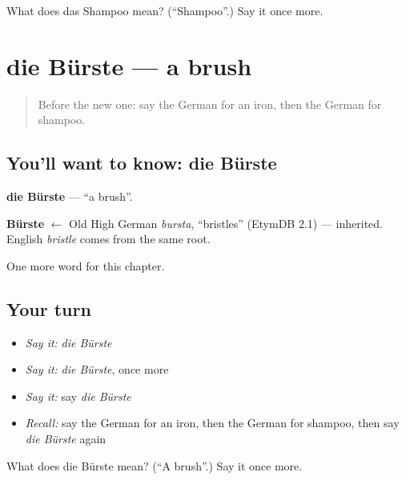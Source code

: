 \begin{tcolorbox}[breakable,colback=teal!4,colframe=teal!35!black,title={Before you move on}]
What does das Shampoo mean? (\textquotedblleft{}Shampoo\textquotedblright{}.) Say it once more.
\end{tcolorbox}
\section[die Bürste]{die Bürste — a brush}

\label{lesson:GE-C202-buerste}



\begin{quote}
Before the new one: say the German for an iron, then the German for shampoo.
\end{quote}

\subsection*{You'll want to know: die Bürste}
\textbf{die Bürste} — \textquotedblleft{}a brush\textquotedblright{}.

\begin{cousinweb}
\textbf{Bürste} $\leftarrow$ Old High German \emph{bursta}, \textquotedblleft{}bristles\textquotedblright{} (EtymDB 2.1) — inherited. English \emph{bristle} comes from the same root.
\end{cousinweb}

\begin{grammarlens}[title={What you've built}]
One more word for this chapter.
\end{grammarlens}

\subsection*{Your turn}
\begin{itemize}
\raggedright
  \item \emph{Say it:} \emph{die Bürste}
  \item \emph{Say it:} \emph{die Bürste}, once more
  \item \emph{Say it:} say \emph{die Bürste}
  \item \emph{Recall:} say the German for an iron, then the German for shampoo, then say \emph{die Bürste} again
\end{itemize}

\begin{tcolorbox}[breakable,colback=teal!4,colframe=teal!35!black,title={Before you move on}]
What does die Bürste mean? (\textquotedblleft{}A brush\textquotedblright{}.) Say it once more.
\end{tcolorbox}
